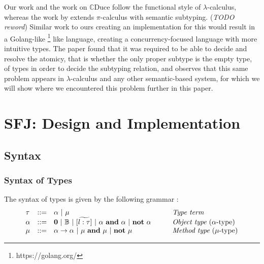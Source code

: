 \documentclass{l4proj}
\begin{document}
Our work and the work on $\mathbb{C}$Duce follow the functional style of $\lambda$-calculus,
whereas the work by \citet{Castagna2008} extends $\pi$-calculus with semantic subtyping.
(\textit{TODO reword}) Similar work to ours creating an implementation for this would result in a
Golang-like \footnote{https://golang.org/} like language, creating a concurrency-focused language with more
intuitive types. The paper found that it was required to be able to decide and resolve the atomicy,
that is whether the only proper subtype is the empty type, of types in order to decide the subtyping
relation, and observes that this same problem appears in $\lambda$-calculus and any other
semantic-based system, for which we will show where we encountered this problem further in this
paper.



\chapter{SFJ: Design and Implementation}

\section{Syntax}

\subsection{Syntax of Types}

\label{sec:design}
The syntax of types is given by the following grammar \citep{Dardha2013,Dardha2017}:
$$
    \begin{array}{llll}
        \tau   & ::=                                       & \alpha \ |\ \mu
               & \mbox{{\em Type term}}
        \\
        \alpha & ::=                                       & \zero \ |\ \btypes \ |\ [\wt{l:\tau}] \ |\ \alpha \ \bf{and}\ \alpha \ |\ \bf{not}\ \alpha
        \qquad
               & \mbox{{\em Object type} ($\alpha $-type)}
        \\
        \mu    & ::=                                       & \alpha \to \alpha \ |\ \mu \ \bf{and}\ \mu \ |\ \bf{not}\ \mu
               & \mbox{{\em Method type} ($\mu $-type)}
    \end{array}
$$
\end{document}
